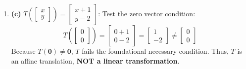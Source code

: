 \begin{enumerate}
    \item \textbf{(c)} $T\left(\begin{bmatrix} x \\ y \end{bmatrix}\right) = \begin{bmatrix} x + 1 \\ y - 2 \end{bmatrix}$:
    Test the zero vector condition:
    \begin{equation*}
    T\left(\begin{bmatrix} 0 \\ 0 \end{bmatrix}\right) = \begin{bmatrix} 0 + 1 \\ 0 - 2 \end{bmatrix} = \begin{bmatrix} 1 \\ -2 \end{bmatrix} \neq \begin{bmatrix} 0 \\ 0 \end{bmatrix}
    \end{equation*}
    Because $T(\mathbf{0}) \neq \mathbf{0}$, $T$ fails the foundational necessary condition. Thus, $T$ is an affine translation, \textbf{NOT a linear transformation}.
\end{enumerate}


